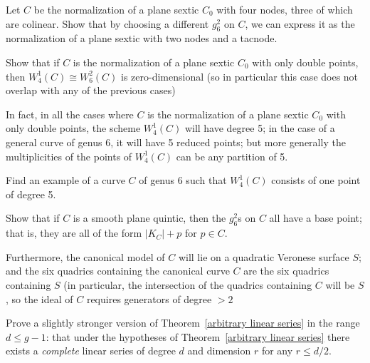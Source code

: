 \begin{exercise}\label{plane models}
Let $C$ be the normalization of a plane sextic $C_0$ with four nodes, three of which are colinear. Show that by choosing a different $g^2_6$ on $C$, we can express it as the normalization of a plane sextic with two nodes and a tacnode.
\end{exercise}


\begin{exercise}
Show that if $C$ is the normalization of a plane sextic $C_0$ with only double points, then $W^1_4(C) \cong W^2_6(C)$ is zero-dimensional (so in particular this case does not overlap with any of the previous cases)
\end{exercise}

In fact, in all the cases where $C$ is the normalization of a plane sextic $C_0$ with only double points, the scheme $W^1_4(C)$ will have degree 5; in the  case of a general curve of genus 6, it will have 5 reduced points; but more generally the multiplicities of the points of $W^1_4(C)$ can be any partition of 5.


\begin{exercise}
Find an example of a curve $C$ of genus 6 such that $W^1_4(C)$ consists of one point of degree 5.
\end{exercise}

\begin{exercise}
Show that if $C$ is a smooth plane quintic, then the $g^2_6$s on $C$ all have a base point; that is, they are all of the form $|K_C| + p$ for $p \in C$. 

Furthermore, the canonical model of $C$ will lie on a quadratic Veronese surface $S$; and the six
quadrics containing the canonical curve $C$ are the six quadrics containing $S$ (in particular, the intersection of the quadrics containing $C$ will be $S$, so
the ideal of $C$ requires generators of degree $>2$
\end{exercise} 

\begin{exercise}
Prove a slightly stronger version of Theorem~\ref{arbitrary linear series} in the range $d \leq g-1$: that under the hypotheses of Theorem~\ref{arbitrary linear series} there exists a \emph{complete} linear series of degree $d$ and dimension $r$ for any $r \leq d/2$.
\end{exercise}

